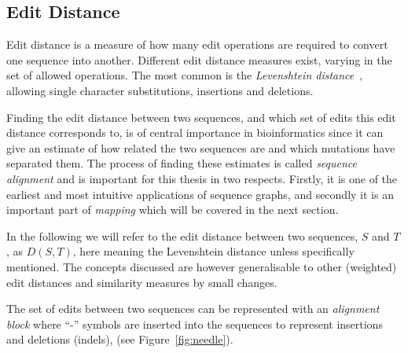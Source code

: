 \subsection{Edit Distance}
Edit distance is a measure of how many edit operations are required to convert one sequence into another.
Different edit distance measures exist, varying in the set of allowed operations.
The most common is the \emph{Levenshtein distance}~\cite{levenshtein}, allowing single character substitutions, insertions and deletions. 

Finding the edit distance between two sequences, and which set of edits this edit distance corresponds to, is of central importance in bioinformatics since it can give an estimate of how related the two sequences are and which mutations have separated them.
The process of finding these estimates is called \emph{sequence alignment} and is important for this thesis in two respects.
Firstly, it is one of the earliest and most intuitive applications of sequence graphs, and secondly it is an important part of \emph{mapping} which will be covered in the next section. 

In the following we will refer to the edit distance between two sequences, $S$ and $T$, as $D(S, T)$, here meaning the Levenshtein distance unless specifically mentioned.
The concepts discussed are however generalisable to other (weighted) edit distances and similarity measures by small changes.

The set of edits between two sequences can be represented with an \emph{alignment block} where ``-'' symbols are inserted into the sequences to represent insertions and deletions (indels), (see Figure~\ref{fig:needle}).

